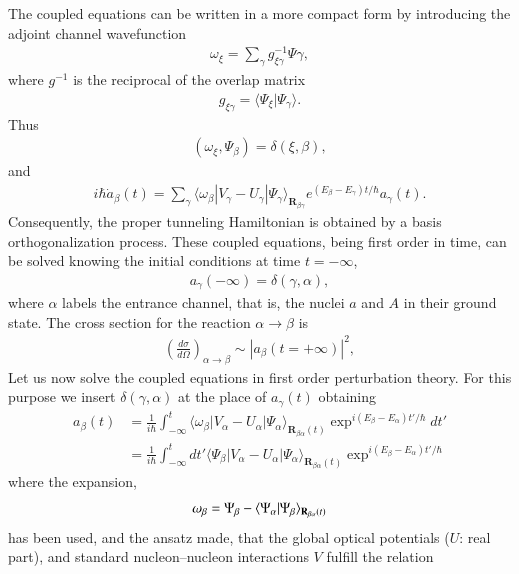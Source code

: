 The coupled equations can be written in a more compact form by introducing the adjoint channel wavefunction 
\begin{align}
\omega_\xi=\sum_{\gamma}g_{\xi\gamma}^{-1}\Psi{\gamma},
\end{align}
where $g^{-1}$ is the reciprocal of the overlap matrix
\begin{align}
g_{\xi\gamma}=\langle\Psi_\xi|\Psi_\gamma\rangle.
\end{align}
Thus
\begin{align}
(\omega_\xi,\Psi_\beta)=\delta(\xi,\beta),
\end{align}
and
\begin{align}
i\hbar\dot a_\beta(t)=\sum_{\gamma}\langle\omega_\beta|V_\gamma-U_\gamma|\Psi_\gamma\rangle_{\mathbf R_{\beta\gamma}}e^{(E_\beta-E_\gamma)t/\hbar}a_\gamma(t).
\end{align}
Consequently, the proper tunneling Hamiltonian is obtained by a basis orthogonalization process. These coupled equations, being first order in time, can be solved knowing the initial conditions at time $t=-\infty$,
\begin{align}
a_\gamma(-\infty)=\delta(\gamma,\alpha),
\end{align}
where $\alpha$ labels the entrance channel, that is, the nuclei $a$ and $A$ in their ground state. The cross section for the reaction $\alpha\rightarrow\beta$ is
\begin{align}
\left(\frac{d\sigma}{d\Omega}\right)_{\alpha\rightarrow\beta}\sim\left|a_\beta(t=+\infty)\right|^2,
\end{align}
Let us now  solve the coupled equations in first order perturbation theory. For this purpose we insert $\delta(\gamma,\alpha)$ at the place of $a_\gamma(t)$ obtaining 
\begin{align}\label{eqintroB17}
\nonumber a_\beta(t)&=\frac{1}{i\hbar}\int_{-\infty}^{t}\langle\omega_\beta|V_\alpha-U_\alpha|\Psi_\alpha\rangle_{\mathbf R_{\beta\alpha}(t)}\exp^{i(E_\beta-E_\alpha)t'/\hbar}dt'\\
&=\frac{1}{i\hbar}\int_{-\infty}^{t}dt'\langle\Psi_\beta|V_\alpha-U_\alpha|\Psi_\alpha\rangle_{\mathbf R_{\beta\alpha}(t)}\exp^{i(E_\beta-E_\alpha)t'/\hbar}
\end{align}
where the expansion,
\begin{align}\label{eqintroB18}
\omega_\beta=\Psi_\beta-\langle {\Psi_\alpha|\Psi_\beta} \rangle_{\mathbf R_{\beta\alpha}(t)}
\end{align}
has been used, and the ansatz made, that the
 global optical potentials ($U$: real part), and standard nucleon--nucleon interactions $V$  fulfill the relation

